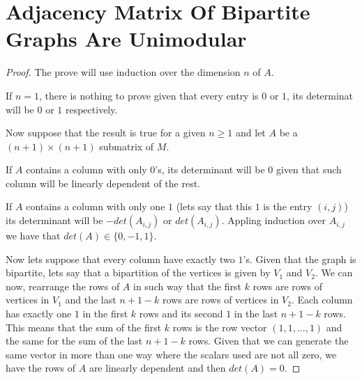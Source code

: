 ﻿\chapter{Adjacency Matrix Of Bipartite Graphs Are Unimodular}


\begin{proof}
    The prove will use induction over the dimension $n$ of $A$.\pn

    If $n = 1$, there is nothing to prove given that every entry is $0$ or $1$, its determinat
    will be $0$ or $1$ respectively.\pn

    Now suppose that the result is true for a given $n \geq 1$ and let $A$ be a $(n+1) \times (n+1)$
    submatrix of $M$.\pn

    If $A$ contains a column with only $0$'s, its determinant will be $0$ given that such column
    will be linearly dependent of the rest.\pn

    If $A$ contains a column with only one $1$ (lets say that this $1$ is the entry $(i,j)$)
    its determinant will be $-det(A_{i,j})$ or $det(A_{i,j})$. Appling induction over $A_{i,j}$
    we have that $det(A) \in \{0, -1, 1\}$.\pn

    Now lets suppose that every column have exactly two $1$'s. Given that the graph is bipartite, 
    lets say that a bipartition of the vertices is given by $V_1$ and $V_2$. We can now, rearrange
    the rows of $A$ in such way that the first $k$ rows are rows of vertices in $V_1$ and the last
    $n+1-k$ rows are rows of vertices in $V_2$. Each column has exactly one $1$ in the first $k$ rows
    and its second $1$ in the last $n+1-k$ rows. This means that the sum of the first $k$ rows is
    the row vector $(1, 1, \dots, 1)$ and the same for the sum of the last $n+1-k$ rows. Given that
    we can generate the same vector in more than one way where the scalars used are not all zero,
    we have the rows of $A$ are linearly dependent and then $det(A) = 0$.
\end{proof}